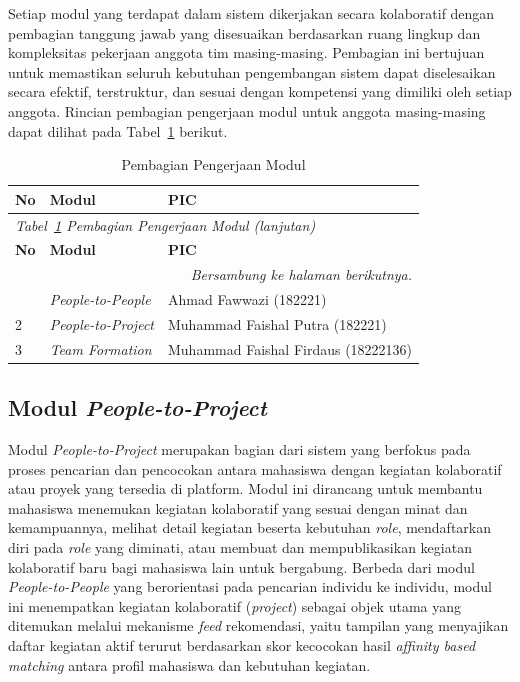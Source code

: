 Setiap modul yang terdapat dalam sistem dikerjakan secara kolaboratif dengan pembagian tanggung jawab yang disesuaikan berdasarkan ruang lingkup dan kompleksitas pekerjaan anggota tim masing-masing. Pembagian ini bertujuan untuk memastikan seluruh kebutuhan pengembangan sistem dapat diselesaikan secara efektif, terstruktur, dan sesuai dengan kompetensi yang dimiliki oleh setiap anggota. Rincian pembagian pengerjaan modul untuk anggota masing-masing dapat dilihat pada Tabel~\ref{tab:pic-modul} berikut.

\begin{longtable}{p{0.6cm} p{4cm} >{\raggedright\arraybackslash}p{\dimexpr\linewidth-4.6cm-6\tabcolsep\relax}}
  \caption{Pembagian Pengerjaan Modul}
  \label{tab:pic-modul} \\
  \toprule
    \textbf{No} & \textbf{Modul} & \textbf{PIC} \\
  \midrule
  \endfirsthead
  \multicolumn{3}{l}{\small\textit{Tabel~\ref{tab:pic-modul} Pembagian Pengerjaan Modul (lanjutan)}} \\
  \toprule
    \textbf{No} & \textbf{Modul} & \textbf{PIC} \\
  \midrule
  \endhead
  \bottomrule
  \multicolumn{3}{r}{\textit{Bersambung ke halaman berikutnya.}} \\
  \endfoot
  \bottomrule
  \endlastfoot
    1 & \emph{People-to-People} & Ahmad Fawwazi (182221) \\
    \midrule
    2 & \emph{People-to-Project} & Muhammad Faishal Putra (182221) \\
    \midrule
    3 & \emph{Team Formation} & Muhammad Faishal Firdaus (18222136) \\
\end{longtable}

\subsection{Modul \emph{People-to-Project}}

Modul \emph{People-to-Project} merupakan bagian dari sistem yang berfokus pada proses pencarian dan pencocokan antara mahasiswa dengan kegiatan kolaboratif atau proyek yang tersedia di platform. Modul ini dirancang untuk membantu mahasiswa menemukan kegiatan kolaboratif yang sesuai dengan minat dan kemampuannya, melihat detail kegiatan beserta kebutuhan \emph{role}, mendaftarkan diri pada \emph{role} yang diminati, atau membuat dan mempublikasikan kegiatan kolaboratif baru bagi mahasiswa lain untuk bergabung. Berbeda dari modul \emph{People-to-People} yang berorientasi pada pencarian individu ke individu, modul ini menempatkan kegiatan kolaboratif (\emph{project}) sebagai objek utama yang ditemukan melalui mekanisme \emph{feed} rekomendasi, yaitu tampilan yang menyajikan daftar kegiatan aktif terurut berdasarkan skor kecocokan hasil \emph{affinity based matching} antara profil mahasiswa dan kebutuhan kegiatan.

